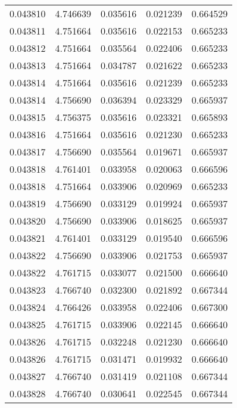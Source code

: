 \begin{tabular}{lrrrr}
0.043810    &  4.746639 &  0.035616 &  0.021239 &             0.664529 \\
0.043811    &  4.751664 &  0.035616 &  0.022153 &             0.665233 \\
0.043812    &  4.751664 &  0.035564 &  0.022406 &             0.665233 \\
0.043813    &  4.751664 &  0.034787 &  0.021622 &             0.665233 \\
0.043814    &  4.751664 &  0.035616 &  0.021239 &             0.665233 \\
0.043814    &  4.756690 &  0.036394 &  0.023329 &             0.665937 \\
0.043815    &  4.756375 &  0.035616 &  0.023321 &             0.665893 \\
0.043816    &  4.751664 &  0.035616 &  0.021230 &             0.665233 \\
0.043817    &  4.756690 &  0.035564 &  0.019671 &             0.665937 \\
0.043818    &  4.761401 &  0.033958 &  0.020063 &             0.666596 \\
0.043818    &  4.751664 &  0.033906 &  0.020969 &             0.665233 \\
0.043819    &  4.756690 &  0.033129 &  0.019924 &             0.665937 \\
0.043820    &  4.756690 &  0.033906 &  0.018625 &             0.665937 \\
0.043821    &  4.761401 &  0.033129 &  0.019540 &             0.666596 \\
0.043822    &  4.756690 &  0.033906 &  0.021753 &             0.665937 \\
0.043822    &  4.761715 &  0.033077 &  0.021500 &             0.666640 \\
0.043823    &  4.766740 &  0.032300 &  0.021892 &             0.667344 \\
0.043824    &  4.766426 &  0.033958 &  0.022406 &             0.667300 \\
0.043825    &  4.761715 &  0.033906 &  0.022145 &             0.666640 \\
0.043826    &  4.761715 &  0.032248 &  0.021230 &             0.666640 \\
0.043826    &  4.761715 &  0.031471 &  0.019932 &             0.666640 \\
0.043827    &  4.766740 &  0.031419 &  0.021108 &             0.667344 \\
0.043828    &  4.766740 &  0.030641 &  0.022545 &             0.667344 \\

\end{tabular}
